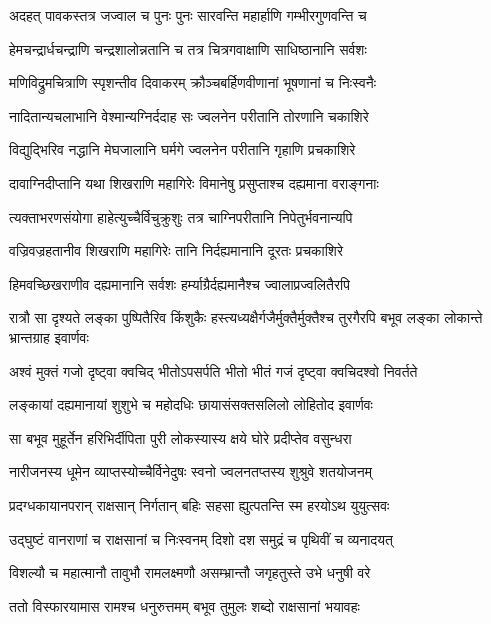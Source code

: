 \twolineshloka
{अदहत् पावकस्तत्र जज्वाल च पुनः पुनः}
{सारवन्ति महार्हाणि गम्भीरगुणवन्ति च} %

\twolineshloka
{हेमचन्द्रार्धचन्द्राणि चन्द्रशालोन्नतानि च}
{तत्र चित्रगवाक्षाणि साधिष्ठानानि सर्वशः} %

\twolineshloka
{मणिविद्रुमचित्राणि स्पृशन्तीव दिवाकरम्}
{क्रौञ्चबर्हिणवीणानां भूषणानां च निःस्वनैः} %

\twolineshloka
{नादितान्यचलाभानि वेश्मान्यग्निर्ददाह सः}
{ज्वलनेन परीतानि तोरणानि चकाशिरे} %

\twolineshloka
{विद्युद्भिरिव नद्धानि मेघजालानि घर्मगे}
{ज्वलनेन परीतानि गृहाणि प्रचकाशिरे} %

\twolineshloka
{दावाग्निदीप्तानि यथा शिखराणि महागिरेः}
{विमानेषु प्रसुप्ताश्च दह्यमाना वराङ्गनाः} %

\twolineshloka
{त्यक्ताभरणसंयोगा हाहेत्युच्चैर्विचुक्रुशुः}
{तत्र चाग्निपरीतानि निपेतुर्भवनान्यपि} %

\twolineshloka
{वज्रिवज्रहतानीव शिखराणि महागिरेः}
{तानि निर्दह्यमानानि दूरतः प्रचकाशिरे} %

\twolineshloka
{हिमवच्छिखराणीव दह्यमानानि सर्वशः}
{हर्म्याग्रैर्दह्यमानैश्च ज्वालाप्रज्वलितैरपि} %

\threelineshloka
{रात्रौ सा दृश्यते लङ्का पुष्पितैरिव किंशुकैः}
{हस्त्यध्यक्षैर्गजैर्मुक्तैर्मुक्तैश्च तुरगैरपि}
{बभूव लङ्का लोकान्ते भ्रान्तग्राह इवार्णवः} %

\twolineshloka
{अश्वं मुक्तं गजो दृष्ट्वा क्वचिद् भीतोऽपसर्पति}
{भीतो भीतं गजं दृष्ट्वा क्वचिदश्वो निवर्तते} %

\twolineshloka
{लङ्कायां दह्यमानायां शुशुभे च महोदधिः}
{छायासंसक्तसलिलो लोहितोद इवार्णवः} %

\twolineshloka
{सा बभूव मुहूर्तेन हरिभिर्दीपिता पुरी}
{लोकस्यास्य क्षये घोरे प्रदीप्तेव वसुन्धरा} %

\twolineshloka
{नारीजनस्य धूमेन व्याप्तस्योच्चैर्विनेदुषः}
{स्वनो ज्वलनतप्तस्य शुश्रुवे शतयोजनम्} %

\twolineshloka
{प्रदग्धकायानपरान् राक्षसान् निर्गतान् बहिः}
{सहसा ह्युत्पतन्ति स्म हरयोऽथ युयुत्सवः} %

\twolineshloka
{उद्घुष्टं वानराणां च राक्षसानां च निःस्वनम्}
{दिशो दश समुद्रं च पृथिवीं च व्यनादयत्} %

\twolineshloka
{विशल्यौ च महात्मानौ तावुभौ रामलक्ष्मणौ}
{असम्भ्रान्तौ जगृहतुस्ते उभे धनुषी वरे} %

\twolineshloka
{ततो विस्फारयामास रामश्च धनुरुत्तमम्}
{बभूव तुमुलः शब्दो राक्षसानां भयावहः} %


